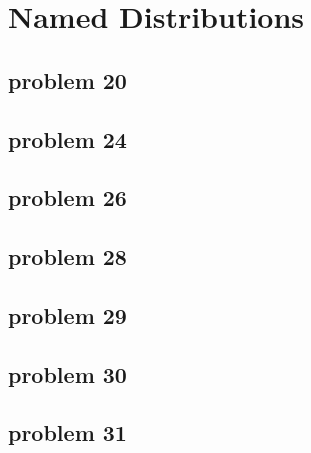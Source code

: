 \section{Named Distributions}

\subsection{problem 20}


\subsection{problem 24}


\subsection{problem 26}


\subsection{problem 28}


\subsection{problem 29}


\subsection{problem 30}


\subsection{problem 31}
